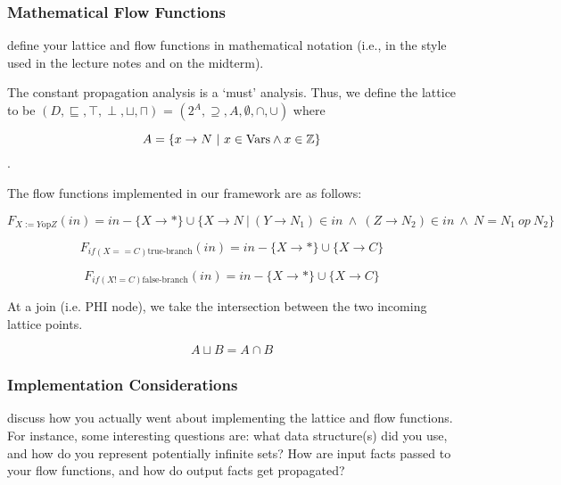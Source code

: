 \documentclass{article}
\theoremstyle{definition}
\begin{document}
\subsubsection{Mathematical Flow Functions}

\begin{framed}
  define your lattice and flow functions in mathematical notation
  (i.e., in the style used in the lecture notes and on the midterm).
  
\end{framed}
The constant propagation analysis is a `must' analysis. Thus, we define the lattice to be $(D, \sqsubseteq, \top, \perp, \sqcup, \sqcap)$ = $(2^A, \supseteq, A, \emptyset, \cap, \cup)$ where

\[ A = \{x \rightarrow N~|~x \in \textup{Vars} \wedge x \in \mathbb{Z}\} \].

The flow functions implemented in our framework are as follows:

\[ F_{X:= Y \text{op} Z}(in) = in - \{X \rightarrow \ast\} \cup \{ X \rightarrow N~|~(Y \rightarrow N_1) \in in~\wedge ~(Z \rightarrow N_2) \in in~\wedge ~N = N_1~op~N_2 \} \]

\[ F_{if(X == C) \text{true-branch}}(in) = in - \{X \rightarrow \ast\} \cup \{ X \rightarrow C \} \]

\[ F_{if(X != C) \text{false-branch}}(in) = in - \{X \rightarrow \ast\} \cup \{ X \rightarrow C \} \]

At a join (i.e. PHI node), we take the intersection between the two incoming lattice points.

\[ A \sqcup B = A \cap B\]

\subsubsection{Implementation Considerations}
\begin{framed}
  discuss how you actually went about implementing the lattice and
  flow functions. For instance, some interesting questions are: what
  data structure(s) did you use, and how do you represent potentially
  infinite sets? How are input facts passed to your flow functions,
  and how do output facts get propagated?
\end{framed}
\end{document}
